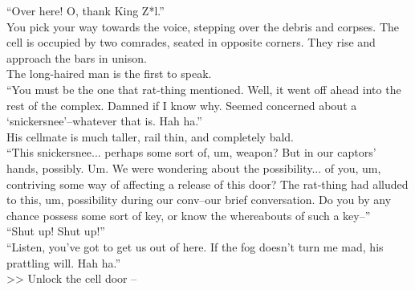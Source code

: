 “Over here! O, thank King Z*l.”\\

You pick your way towards the voice, stepping over the debris and corpses. The cell is occupied by two comrades, seated in opposite corners. They rise and approach the bars in unison.\\

The long-haired man is the first to speak.\\
“You must be the one that rat-thing mentioned. Well, it went off ahead into the rest of the complex. Damned if I know why. Seemed concerned about a ‘snickersnee’--whatever that is. Hah ha.”\\

His cellmate is much taller, rail thin, and completely bald.\\
“This snickersnee... perhaps some sort of, um, weapon? But in our captors’ hands, possibly. Um. We were wondering about the possibility... of you, um, contriving some way of affecting a release of this door? The rat-thing had alluded to this, um, possibility during our conv--our brief conversation. Do you by any chance possess some sort of key, or know the whereabouts of such a key--”\\

“Shut up! Shut up!”\\

“Listen, you’ve got to get us out of here. If the fog doesn’t turn me mad, his prattling will. Hah ha.”\\

>> Unlock the cell door -- 
